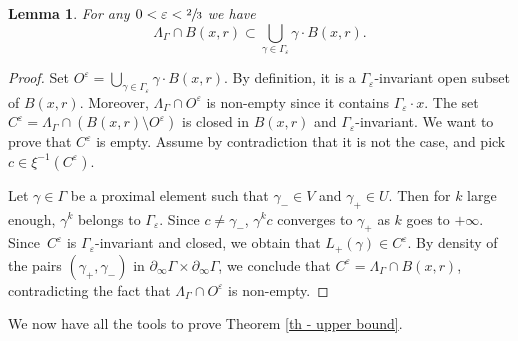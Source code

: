 \documentclass[11pt]{article}
\numberwithin{equation}{section}
\newtheorem{lemma}[theo]{Lemma}
\theoremstyle{definition}
\let\epsilon\varepsilon
\let\G\Gamma
\let\g\gamma
\begin{document}
\begin{lemma} \label{lem - covering the limit set}
For any $0<\epsilon< \sfrac{2}{3}$ we have
\[\Lambda_\Gamma\cap B(x,r) \subset \bigcup_{\g \in \G_\epsilon} \g \cdot B(x,r).\]
\end{lemma}

\begin{proof}
Set $O^\epsilon = \bigcup_{\g \in \G_\epsilon} \g \cdot B(x,r)$.
By definition, it is a $\G_\epsilon$-invariant open subset of $B(x,r)$. Moreover, $\Lambda_\Gamma \cap O^\epsilon$ is non-empty since it contains $\G_\epsilon \cdot x$. The set $C^\epsilon = \Lambda_\G \cap (B(x,r)\setminus O^\epsilon)$ is closed in $B(x,r)$ and $\G_\epsilon$-invariant. We want to prove that $C^\epsilon$ is empty. Assume by contradiction that it is not the case, and pick $c \in \xi^{-1}(C^\epsilon)$.

Let $\g \in \G$ be a proximal element such that $\g_- \in V$ and $\g_+ \in U$. Then for $k$ large enough, $\g^k$ belongs to $\G_\epsilon$. Since $c\neq \g_-$, $\g^k c$ converges to $\g_+$ as $k$ goes to $+\infty$. Since~$C^\epsilon$ is $\G_\epsilon$-invariant and closed, we obtain that $L_+(\g)\in C^\epsilon$. By density of the pairs $(\g_+,\g_-)$ in $\partial_\infty \G\times\partial_\infty\G$, we conclude that $C^\epsilon = \Lambda_\Gamma\cap B(x,r)$, contradicting the fact that $\Lambda_\Gamma \cap O^\epsilon$ is non-empty.
\end{proof}

We now have all the tools to prove Theorem \ref{th - upper bound}.
\end{document}
